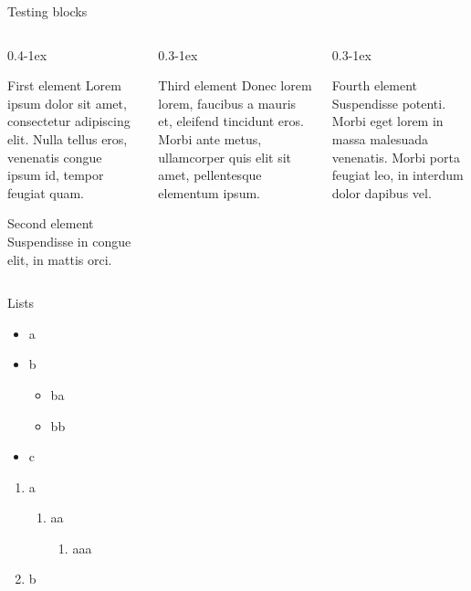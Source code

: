 \documentclass[aspectratio=169]{beamer}
\begin{document}
\begin{frame}{Testing blocks}
  \begin{columns}[t,onlytextwidth]
    \begin{column}{0.4\textwidth-1ex}
      \begin{block}{First element}
        Lorem ipsum dolor sit amet, consectetur adipiscing elit. Nulla tellus eros, venenatis congue ipsum id, tempor feugiat quam.
      \end{block}
      \begin{block}{Second element}
        Suspendisse in congue elit, in mattis orci.
      \end{block}
    \end{column}

    \begin{column}{0.3\textwidth-1ex}
      \begin{block}{Third element}
        Donec lorem lorem, faucibus a mauris et, eleifend tincidunt eros. Morbi ante metus, ullamcorper quis elit sit amet, pellentesque elementum ipsum.
      \end{block}
    \end{column}

    \begin{column}{0.3\textwidth-1ex}
      \begin{block}{Fourth element}
        Suspendisse potenti. Morbi eget lorem in massa malesuada venenatis. Morbi porta feugiat leo, in interdum dolor dapibus vel.
      \end{block}
    \end{column}
  \end{columns}
\end{frame}

\begin{frame}{Lists}

  \begin{itemize}
    \item a
    \item b
      \begin{itemize}
        \item ba
        \item bb
      \end{itemize}
    \item c
  \end{itemize}

  \begin{enumerate}
    \item a
      \begin{enumerate}
        \item aa
          \begin{enumerate}
            \item aaa
          \end{enumerate}
      \end{enumerate}
    \item b
  \end{enumerate}
\end{frame}
\end{document}
